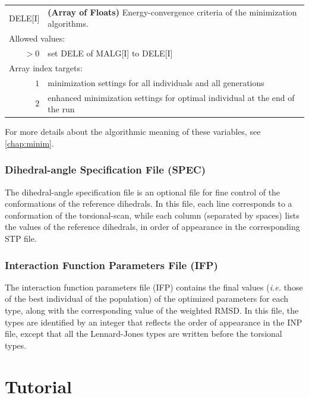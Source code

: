 \documentclass[10pt,a4paper,openany]{memoir}
\numberwithin{equation}{section}
\begin{document}
{
\begin{tabular}{r@{ : }l}
\label{descr:dele}
      DELE[I]&\textbf{(Array of Floats)} Energy-convergence criteria of the minimization algorithms.                                          \\ 
\multicolumn{2}{l}{Allowed values:} \\ 
    \(>0\)&set DELE of MALG[I] to DELE[I] \\ 
\multicolumn{2}{l}{Array index targets:} \\ 
  \(1\)&minimization settings for all individuals and all generations \\
  \(2\)&enhanced minimization settings for optimal individual at the end of the run \\
\end{tabular}
\vspace{1ex}
}

\noindent For more details about the algorithmic meaning of these variables, see \autoref{chap:minim}.

\subsection{Dihedral-angle Specification File (SPEC)}
\label{sec:file-formats-spec}

The dihedral-angle specification file is an optional file for fine
control of the conformations of the reference dihedrals. In this file,
each line corresponds to a conformation of the torsional-scan, while
each column (separated by spaces) lists the values of the reference
dihedrals, in order of appearance in the corresponding STP file.

\subsection{Interaction Function Parameters File (IFP)}
\label{sec:file-formats-IFP}

The interaction function parameters file (IFP) contains the final
values (\textit{i.e.} those of the best individual of the population)
of the optimized parameters for each type, along with the
corresponding value of the weighted RMSD. In this file, the types are
identified by an integer that reflects the order of appearance in the
INP file, except that all the Lennard-Jones types are written before
the torsional types.


\chapter{Tutorial}
\label{chap:tutorial}
 
\end{document}

